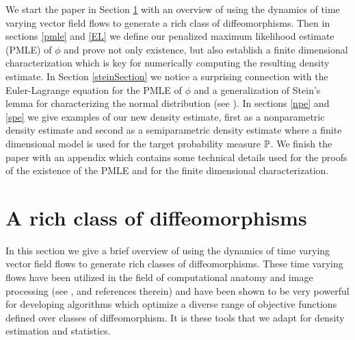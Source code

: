 \documentclass[noinfoline]{imsart}
\begin{document}
We start the paper in Section \ref{rich} with an overview of using the  dynamics of time varying vector field flows to generate a rich class of diffeomorphisms. Then in sections \ref{pmle} and \ref{EL} we define our penalized maximum likelihood estimate (PMLE) of $\phi$ and prove not  only existence, but also establish a  finite dimensional characterization which is key for numerically computing the resulting density estimate. In Section \ref{steinSection} we notice a surprising connection with the Euler-Lagrange equation for the PMLE of $\phi$ and a generalization of Stein's lemma for characterizing the normal distribution (see \cite{stein:04}). In sections \ref{npe} and \ref{spe} we give examples of our new density estimate, first as a nonparametric density estimate and second as a semiparametric density estimate where a finite dimensional model is used for the target probability measure $\Bbb P$. We finish the paper with an appendix which contains some technical details used for the proofs of the existence of the PMLE and for the finite dimensional characterization. 


\section{A rich class of diffeomorphisms}
\label{rich}

 In this section we give a brief overview of using the  dynamics of time varying vector field flows to generate rich classes of diffeomorphisms. These time varying flows have been utilized   in the field of computational anatomy and image processing (see \cite{Younes:2008}, and references therein) and have been shown to be very powerful  for developing algorithms which optimize a diverse range of objective functions defined over classes of diffeomorphism.  It is these tools that we adapt for density estimation and statistics.
\end{document}
